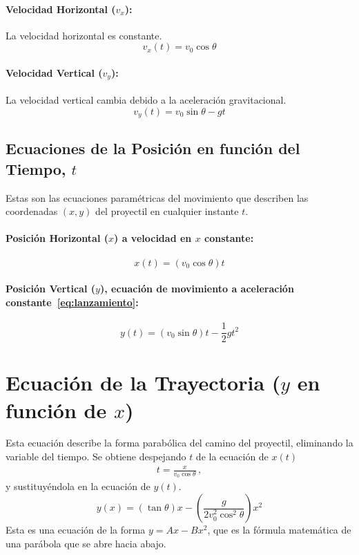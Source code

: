 \documentclass[11pt,a4paper]{book}
\begin{document}
\paragraph{Velocidad Horizontal ($v_x$):}
La velocidad horizontal es constante.
\begin{equation}
    \boxed{v_x(t) = v_0 \cos\theta}
\end{equation}

\paragraph{Velocidad Vertical ($v_y$):}
La velocidad vertical cambia debido a la aceleración gravitacional.
\begin{equation}
    \boxed{v_y(t) = v_0 \sin\theta - gt}
\end{equation}

\subsection*{Ecuaciones de la Posición en función del Tiempo, $t$}
Estas son las ecuaciones paramétricas del movimiento que describen las coordenadas $(x, y)$ del proyectil en cualquier instante $t$.

\paragraph{Posición Horizontal ($x$) a velocidad en $x$ constante:}
\begin{equation}
    \boxed{x(t) = (v_0 \cos\theta) t}
\end{equation}

\paragraph{Posición Vertical ($y$), ecuación de movimiento a aceleración constante~\eqref{eq:lanzamiento}:}
\begin{equation}
    \boxed{y(t) = (v_0 \sin\theta) t - \frac{1}{2}gt^2}
\end{equation}

\section*{Ecuación de la Trayectoria ($y$ en función de $x$)}
Esta ecuación describe la forma parabólica del camino del proyectil, eliminando la variable del tiempo. Se obtiene despejando $t$ de la ecuación de $x(t)$
\begin{align}
    t = \frac{x}{v_0\cos\theta}\,,
\end{align}
y sustituyéndola en la ecuación de $y(t)$.
\begin{equation}
    \boxed{
    y(x) = (\tan\theta)x - \left(\frac{g}{2v_0^2\cos^2\theta}\right)x^2
    }
\end{equation}
Esta es una ecuación de la forma $y = Ax - Bx^2$, que es la fórmula matemática de una parábola que se abre hacia abajo.
\end{document}
